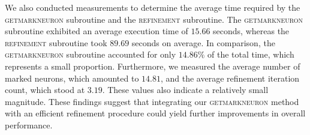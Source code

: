 We also conducted measurements to determine the average time required by the \textsc{getmarkneuron} subroutine 
and the \textsc{refinement} subroutine. 
The \textsc{getmarkneuron} subroutine exhibited an average execution time of $15.66$ seconds, 
whereas the \textsc{refinement} subroutine took $89.69$ seconds on average. 
In comparison, the \textsc{getmarkneuron} subroutine accounted for only $14.86\%$ of the total time, 
which represents a small proportion. Furthermore, we measured the average number of marked neurons, 
which amounted to $14.81$, and the average refinement iteration count, which stood at $3.19$. 
These values also indicate a relatively small magnitude. 
These findings suggest that integrating our \textsc{getmarkneuron} method with an efficient refinement 
procedure could yield further improvements in overall performance.










